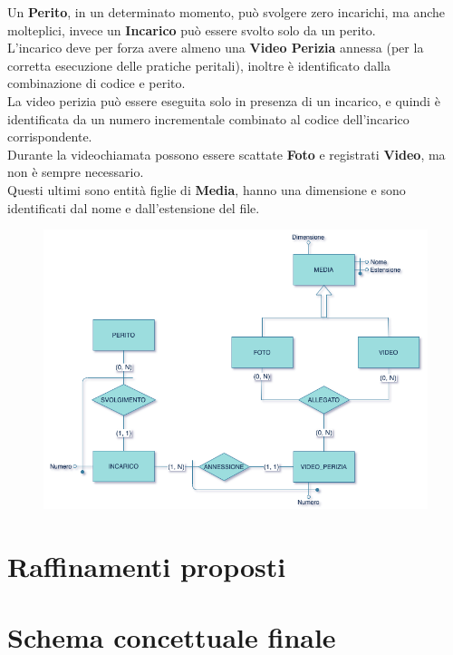 \documentclass[a4paper,12pt]{report}
\begin{document}
Un \textbf{Perito}, in un determinato momento, può svolgere zero incarichi, ma anche molteplici, invece un \textbf{Incarico} può essere svolto solo da un perito.
\\
L’incarico deve per forza avere almeno una \textbf{Video Perizia} annessa (per la corretta esecuzione delle pratiche peritali), inoltre è identificato dalla combinazione di codice e perito.
\\
La video perizia può essere eseguita solo in presenza di un incarico, e quindi è identificata da un numero incrementale combinato al codice dell’incarico corrispondente.
\\
Durante la videochiamata possono essere scattate \textbf{Foto} e registrati \textbf{Video}, ma non è sempre necessario.
\\
Questi ultimi sono entità figlie di \textbf{Media}, hanno una dimensione e sono identificati dal nome e dall’estensione del file.
\\
\begin{figure}[ht]
    \begin{center}
        \centering
        \includegraphics[width=\textwidth]{img/VideoPerizia.png}
    \end{center}
\end{figure}
\clearpage

\section{Raffinamenti proposti}

\section{Schema concettuale finale}
\end{document}
